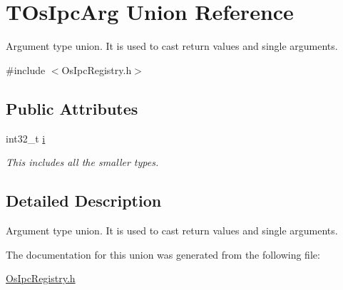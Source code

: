 \hypertarget{unionTOsIpcArg}{}\section{T\+Os\+Ipc\+Arg Union Reference}
\label{unionTOsIpcArg}


Argument type union. It is used to cast return values and single arguments.  




{\ttfamily \#include $<$Os\+Ipc\+Registry.\+h$>$}

\subsection*{Public Attributes}
\begin{DoxyCompactItemize}
\item 
\mbox{\label{unionTOsIpcArg_a1ecdf39bb385368b65b70f56b1ba4af1}} 
int32\+\_\+t \hyperlink{unionTOsIpcArg_a1ecdf39bb385368b65b70f56b1ba4af1}{i}
\begin{DoxyCompactList}\small\item\em This includes all the smaller types. \end{DoxyCompactList}\end{DoxyCompactItemize}


\subsection{Detailed Description}
Argument type union. It is used to cast return values and single arguments. 

The documentation for this union was generated from the following file\+:\begin{DoxyCompactItemize}
\item 
\hyperlink{OsIpcRegistry_8h}{Os\+Ipc\+Registry.\+h}\end{DoxyCompactItemize}
